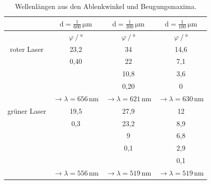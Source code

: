 \begin{table}[H]
    \centering
    \caption{Wellenlängen aus den Ablenkwinkel und Beugungsmaxima.} 
    \label{Tabelle}
    \begin{tabular} {c  c  c  c}
        \toprule
        {}&
        {$ \text{d} = \frac{1}{600}\,\unit{\micro\meter} $} &
        {$ \text{d} = \frac{1}{300}\,\unit{\micro\meter} $} &
        {$ \text{d} = \frac{1}{100}\,\unit{\micro\meter} $} \\
        \hline
        {}&
        {$ \varphi \mathbin{/} \unit{\degree}$} &
        {$ \varphi \mathbin{/} \unit{\degree}$}  &
        {$ \varphi \mathbin{/} \unit{\degree}$}  \\
        \midrule
        roter Laser & 23,2 & 34   & 14,6  \\
                    & 0,40 & 22   & 7,1   \\
                    &      & 10,8 & 3,6     \\
                    &      & 0,20 & 0       \\
                    & $\to \lambda = 656\,\unit{\nano\meter}$ & $\to \lambda = 621\,\unit{\nano\meter}$ & $\to \lambda = 630\,\unit{\nano\meter}$  \\
                    \hline
        grüner Laser & 19,5 & 27,9 & 12  \\
                     & 0,3  & 23,2 &  8,9 \\
                     &  & 9    & 6,8 \\
                     &  & 0,1  & 2,9 \\
                     &  &      & 0,1 \\
         & $\to \lambda = 556\,\unit{\nano\meter}$ & $\to \lambda = 519\,\unit{\nano\meter}$ & $\to \lambda = 519\,\unit{\nano\meter}$ \\
        \bottomrule
    \end{tabular} 
\end{table}
